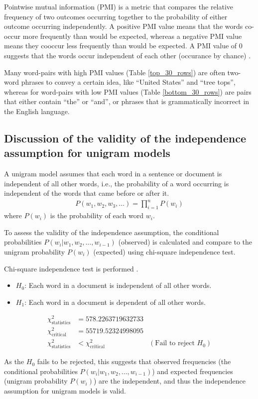 Pointwise mutual information (PMI) is a metric that compares the relative frequency of two outcomes occurring together to the probability of either outcome occurring independently.
A positive PMI value means that the words co-occur more frequently than would be expected, whereas a negative PMI value means they cooccur less frequently than would be expected.
A PMI value of 0 suggests that the words occur independent of each other (occurance by chance) \cite{web:pmi}. 

Many word-pairs with high PMI values (Table \ref{top_30_rows}) are often two-word phrases to convey a certain idea, like ``United States'' and ``tree tops'', 
whereas for word-pairs with low PMI values (Table \ref{bottom_30_rows}) are pairs that either contain ``the'' or ``and'', or phrases that is grammatically incorrect in the English language. 


\subsection*{Discussion of the validity of the independence assumption for unigram models}

A unigram model assumes that each word in a sentence or document is independent of all other words, 
i.e., the probability of a word occurring is independent of the words that came before or after it.
\begin{align}
    P(w_1, w_2, w_3, \dots) = \prod^{n}_{i=1} P(w_i)
\end{align}
where $P(w_i)$ is the probability of each word $w_i$.

To assess the validity of the independence assumption, 
the conditional probabilities $P(w_i | w_1, w_2, \dots, w_{i-1})$ (observed) is calculated
and compare to the unigram probability $P(w_i)$ (expected)
using chi-square independence test.

Chi-square independence test is performed \cite{web:chi_sq_test}.
\begin{itemize}
    \item $H_0$: Each word in a document is independent of all other words.
    \item $H_1$: Each word in a document is dependent of all other words.
\end{itemize}

\begin{align*}
    \chi^2_{\text{statistics}} & = 578.2263719632733 \\
    \chi^2_{\text{critical}} & = 55719.52324998095 \\
    \chi^2_{\text{statistics}} & < \chi^2_{\text{critical}} & (\text{Fail to reject } H_0)
\end{align*}

As the $H_0$ fails to be rejected, this suggests that observed frequencies (the conditional probabilities $P(w_i | w_1, w_2, \dots, w_{i-1})$) and expected frequencies (unigram probability $P(w_i)$) are the independent, and thus the independence assumption for unigram models is valid.